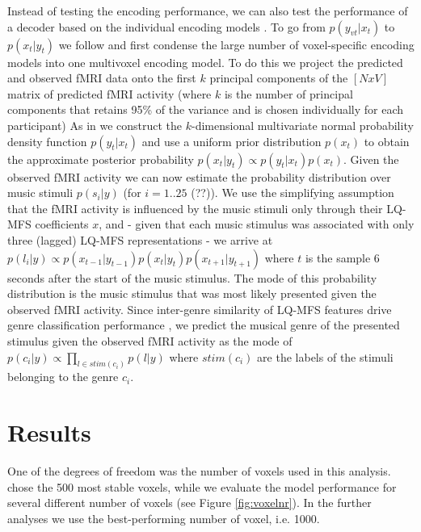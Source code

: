 Instead of testing the encoding performance, we can also test the performance of
a decoder based on the individual encoding models \citet{NG11}. To go from
$p(y_{vt}|x_{t})$ to $p(x_{t}|y_{t})$ we follow \citet{NG09} and first condense
the large number of voxel-specific encoding models into one multivoxel encoding model.
To do this we project the predicted and observed f{MRI} data onto the first $k$ principal components of the $[N x V]$ matrix of predicted f{MRI} activity  (where $k$ is the number of principal components that retains 95\% of the variance and is chosen individually for each participant) 
As in \citet{NG09} we construct the $k$-dimensional multivariate normal
probability density function $p(y_{t}|x_{t})$ and use a uniform prior
distribution $p(x_{t})$ to obtain the approximate posterior probability
$p(x_{t}|y_{t}) \propto p(y_{t}|x_{t})p(x_{t})$. Given the observed f{MRI}
activity we can now estimate the probability distribution over music stimuli
$p(s_{i}|y)$ (for $i=1..25$ (??)). We use the simplifying assumption that the
f{MRI} activity is influenced by the music stimuli only through their LQ-MFS
coefficients $x$, and - given that each music stimulus was associated with only
three (lagged) LQ-MFS representations - we arrive at $p(l_{i}|y) \propto
p(x_{t-1}|y_{t-1})p(x_{t}|y_{t})p(x_{t+1}|y_{t+1})$ where $t$ is the sample 6
seconds after the start of the music stimulus. The mode of this probability
distribution is the music stimulus that was most likely presented given the
observed f{MRI} activity. Since inter-genre similarity of LQ-MFS features drive
genre classification performance \citep{CTK+2012}, we predict the musical genre
of the presented stimulus given the observed f{MRI} activity as the mode of $p(c_{i}|y)
\propto \prod\nolimits_{l \in stim(c_{i})} p(l|y)$ where $stim(c_{i})$ are
the labels of the stimuli belonging to the genre $c_{i}$. 

\section*{Results}
%
 One of the degrees
of freedom was the number of voxels used in this analysis. \citet{ML08} chose
the 500 most stable voxels, while we evaluate the model performance for several
different number of voxels (see Figure \ref{fig:voxelnr}). In the further
analyses we use the best-performing number of voxel, i.e. 1000.

